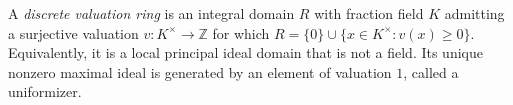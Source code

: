 
A \emph{discrete valuation ring} is an integral domain $R$ with fraction field $K$ admitting a surjective valuation $v:K^\times\to\mathbb Z$ for which $R=\{0\}\cup\{x\in K^\times:v(x)\ge0\}$. Equivalently, it is a local principal ideal domain that is not a field. Its unique nonzero maximal ideal is generated by an element of valuation $1$, called a uniformizer.
